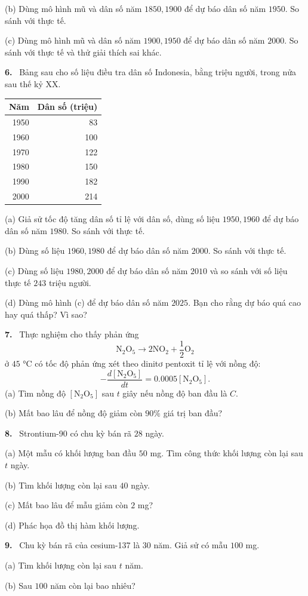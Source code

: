\documentclass[12pt,a4paper]{article}
\newcommand{\bt}[1]{\par\smallskip\noindent\textbf{#1.}\ }
\begin{document}
(b) Dùng mô hình mũ và dân số năm $1850,1900$ để dự báo dân số năm $1950$. So sánh với thực tế.

(c) Dùng mô hình mũ và dân số năm $1900,1950$ để dự báo dân số năm $2000$. So sánh với thực tế và thử giải thích sai khác.
\bt{6} Bảng sau cho số liệu điều tra dân số Indonesia, bằng triệu người, trong nửa sau thế kỷ XX.
\begin{center}\begin{tabular}{rr}\toprule
Năm & Dân số (triệu)\\\midrule
1950&83\\1960&100\\1970&122\\1980&150\\1990&182\\2000&214\\\bottomrule
\end{tabular}\end{center}
(a) Giả sử tốc độ tăng dân số tỉ lệ với dân số, dùng số liệu $1950,1960$ để dự báo dân số năm $1980$. So sánh với thực tế.

(b) Dùng số liệu $1960,1980$ để dự báo dân số năm $2000$. So sánh với thực tế.

(c) Dùng số liệu $1980,2000$ để dự báo dân số năm $2010$ và so sánh với số liệu thực tế $243$ triệu người.

(d) Dùng mô hình (c) để dự báo dân số năm $2025$. Bạn cho rằng dự báo quá cao hay quá thấp? Vì sao?
\bt{7} Thực nghiệm cho thấy phản ứng
\[\mathrm N_2\mathrm O_5\longrightarrow2\mathrm N\mathrm O_2+\frac12\mathrm O_2\]
ở $45$ °C có tốc độ phản ứng xét theo dinitơ pentoxit tỉ lệ với nồng độ:
\[-\frac{d[\mathrm N_2\mathrm O_5]}{dt}=0.0005[\mathrm N_2\mathrm O_5].\]
(a) Tìm nồng độ $[\mathrm N_2\mathrm O_5]$ sau $t$ giây nếu nồng độ ban đầu là $C$.

(b) Mất bao lâu để nồng độ giảm còn $90\%$ giá trị ban đầu?
\bt{8} Strontium-90 có chu kỳ bán rã $28$ ngày.

(a) Một mẫu có khối lượng ban đầu $50$ mg. Tìm công thức khối lượng còn lại sau $t$ ngày.

(b) Tìm khối lượng còn lại sau $40$ ngày.

(c) Mất bao lâu để mẫu giảm còn $2$ mg?

(d) Phác họa đồ thị hàm khối lượng.
\bt{9} Chu kỳ bán rã của cesium-137 là $30$ năm. Giả sử có mẫu $100$ mg.

(a) Tìm khối lượng còn lại sau $t$ năm.

(b) Sau $100$ năm còn lại bao nhiêu?
\end{document}
